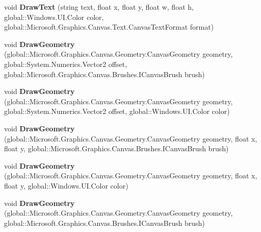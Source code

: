 \begin{DoxyCompactItemize}
void {\bfseries Draw\+Text} (string text, float x, float y, float w, float h, global\+::\+Windows.\+U\+I.\+Color color, global\+::\+Microsoft.\+Graphics.\+Canvas.\+Text.\+Canvas\+Text\+Format format)
\item 
\mbox{\label{class_microsoft_1_1_graphics_1_1_canvas_1_1_canvas_drawing_session_af6ccc8372b7d4df50913a0fa22efb8f1}} 
void {\bfseries Draw\+Geometry} (global\+::\+Microsoft.\+Graphics.\+Canvas.\+Geometry.\+Canvas\+Geometry geometry, global\+::\+System.\+Numerics.\+Vector2 offset, global\+::\+Microsoft.\+Graphics.\+Canvas.\+Brushes.\+I\+Canvas\+Brush brush)
\item 
\mbox{\label{class_microsoft_1_1_graphics_1_1_canvas_1_1_canvas_drawing_session_a93d6e04e19f5c5443c5c174550b9d000}} 
void {\bfseries Draw\+Geometry} (global\+::\+Microsoft.\+Graphics.\+Canvas.\+Geometry.\+Canvas\+Geometry geometry, global\+::\+System.\+Numerics.\+Vector2 offset, global\+::\+Windows.\+U\+I.\+Color color)
\item 
\mbox{\label{class_microsoft_1_1_graphics_1_1_canvas_1_1_canvas_drawing_session_a48eb0c334ababf8c3716b45c569c3005}} 
void {\bfseries Draw\+Geometry} (global\+::\+Microsoft.\+Graphics.\+Canvas.\+Geometry.\+Canvas\+Geometry geometry, float x, float y, global\+::\+Microsoft.\+Graphics.\+Canvas.\+Brushes.\+I\+Canvas\+Brush brush)
\item 
\mbox{\label{class_microsoft_1_1_graphics_1_1_canvas_1_1_canvas_drawing_session_a57643b455bab22b3fe9e8d78f470fcdb}} 
void {\bfseries Draw\+Geometry} (global\+::\+Microsoft.\+Graphics.\+Canvas.\+Geometry.\+Canvas\+Geometry geometry, float x, float y, global\+::\+Windows.\+U\+I.\+Color color)
\item 
\mbox{\label{class_microsoft_1_1_graphics_1_1_canvas_1_1_canvas_drawing_session_a4a1e501e8250e1c79e77a5161344cdd1}} 
void {\bfseries Draw\+Geometry} (global\+::\+Microsoft.\+Graphics.\+Canvas.\+Geometry.\+Canvas\+Geometry geometry, global\+::\+Microsoft.\+Graphics.\+Canvas.\+Brushes.\+I\+Canvas\+Brush brush)

\end{DoxyCompactItemize}
